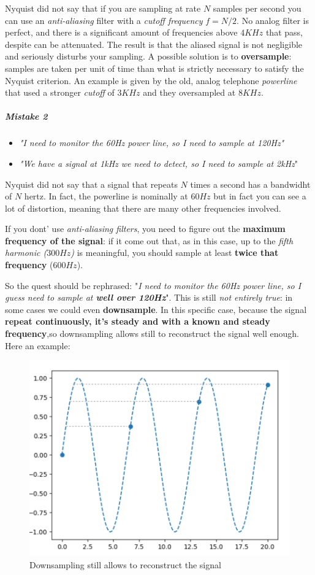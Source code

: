 \documentclass[10pt,a4paper]{report}
\theoremstyle{definition}
\begin{document}
Nyquist did not say that if you are sampling at rate $N$ samples per second you can use an \textit{anti-aliasing} filter with a \textit{cutoff frequency} $f=N/2$.
No analog filter is perfect, and there is a significant amount of frequencies above $4KHz$ that pass, despite can be attenuated.
The result is that the aliased signal is not negligible and seriously disturbs your sampling.
A possible solution is to \textbf{oversample}: samples are taken per unit of time than what is strictly necessary to satisfy the Nyquist criterion.
An example is given by the old, analog telephone \textit{powerline} that used a stronger \textit{cutoff} of $3KHz$ and they oversampled at $8 KHz$.
\subparagraph{Mistake 2}\label{sec:mistake-2}\begin{itemize}
	\item 
	\textit{"I need to monitor the 60Hz power line, so I need to sample at 120Hz"}
	\item 
	\textit{"We have a signal at 1kHz we need to detect, so I need to sample at 2kHz}"
\end{itemize}

Nyquist did not say that a signal that repeats $N$ times a second has a bandwidht of $N$ hertz.
In fact, the powerline is nominally at $60Hz$ but in fact you can see a lot of distortion, meaning that there are many other frequencies involved.

If you dont' use \textit{anti-aliasing filters}, you need to figure out the \textbf{maximum frequency of the signal}: if it come out that, as in this case, up to the \textit{fifth harmonic ($300Hz$)} is meaningful, you should sample at least \textbf{twice that frequency} ($600Hz$).

So the quest should be rephrased: "\textit{I need to monitor the 60Hz power line, so I guess need to sample at \textbf{well over 120Hz}}".
This is still \textit{not entirely true}: in some cases we could even \textbf{downsample}. In this specific case, because the signal \textbf{repeat continuously, it's steady and with a known and steady frequency},so downsampling allows still to reconstruct the signal well enough.
Here an example:
\begin{figure}[h]
	\centering\includegraphics[scale=0.50]{images/Pasted image 20230526140651.png}
	\caption{Downsampling still allows to reconstruct the signal}
\end{figure}
\end{document}
